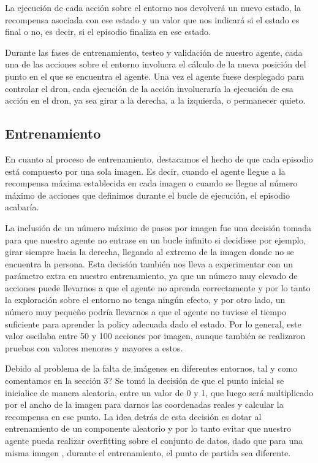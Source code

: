 La ejecución de cada acción sobre el entorno nos devolverá un nuevo estado, la recompensa asociada con ese estado y un valor que nos indicará si el estado es final o no, es decir, si el episodio finaliza en ese estado. 
\medskip

Durante las fases de entrenamiento, testeo y validación de nuestro agente, cada una de las acciones sobre el entorno involucra el cálculo de la nueva posición del punto en el que se encuentra el agente. Una vez el agente fuese desplegado para controlar el dron, cada ejecución de la acción involucraría la ejecución de esa acción en el dron, ya sea girar a la derecha, a la izquierda, o permanecer quieto.
\medskip


\subsection{Entrenamiento}
\label{entrenamiento}

En cuanto al proceso de entrenamiento, destacamos el hecho de que cada episodio está compuesto por una sola imagen. Es decir, cuando el agente llegue a la recompensa máxima establecida en cada imagen o cuando se llegue al número máximo de acciones que definimos durante el bucle de ejecución, el episodio acabaría. 
\medskip

La inclusión de un número máximo de pasos por imagen fue una decisión tomada para que nuestro agente no entrase en un bucle infinito si decidiese por ejemplo, girar siempre hacia la derecha, llegando al extremo de la imagen donde no se encuentra la persona. Esta decisión también nos lleva a experimentar con un parámetro extra en nuestro entrenamiento, ya que un número muy elevado de acciones puede llevarnos a que el agente no aprenda correctamente y por lo tanto la exploración sobre el entorno no tenga ningún efecto, y por otro lado, un número muy pequeño podría llevarnos a que el agente no tuviese el tiempo suficiente para aprender la policy adecuada dado el estado. Por lo general, este valor oscilaba entre 50 y 100 acciones por imagen, aunque también se realizaron pruebas con valores menores y mayores a estos.
\medskip

Debido al problema de la falta de imágenes en diferentes entornos, tal y como comentamos en la sección 3? Se tomó la decisión de que el punto inicial se inicialice de manera aleatoria, entre un valor de 0 y 1, que luego será multiplicado por el ancho de la imagen para darnos las coordenadas reales y calcular la recompensa en ese punto. La idea detrás de esta decisión es dotar al entrenamiento de un componente aleatorio y por lo tanto evitar que nuestro agente pueda realizar overfitting sobre el conjunto de datos, dado que para una misma imagen , durante el entrenamiento, el punto de partida sea diferente.
\medskip

